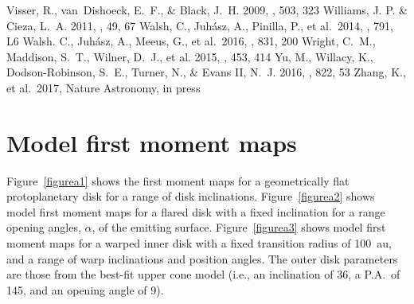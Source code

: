 \documentclass[onecolumn]{aastex6}
\newcommand{\kms}{km~s$^{-1}$}
\begin{document}
\begin{thebibliography}{}
 Visser, R., van~Dishoeck, E.~F., \& Black, J.~H. 2009, \aap, 503, 323
 Williams, J. P. \& Cieza, L.~A. 2011, \araa, 49, 67
 Walsh, C., Juh\'{a}sz, A., Pinilla, P., et al.~2014, \apjl, 791, L6
 Walsh. C., Juh\'{a}sz, A., Meeus, G., et al.~2016, \apj, 831, 200
 Wright, C.~M., Maddison, S.~T., Wilner, D.~J., et al. 2015, \mnras, 453, 414
 Yu, M., Willacy, K., Dodson-Robinson, S.~E., Turner, N., \& Evans II, N.~J. 2016, \apj, 822, 53
 Zhang, K., et al.~2017, Nature Astronomy, in press
\end{thebibliography}

\appendix

\section{Model first moment maps}

Figure~\ref{figurea1} shows the first moment maps for a geometrically
flat protoplanetary disk for a range of disk inclinations.
Figure~\ref{figurea2} shows model first moment maps for a flared
disk with a fixed inclination for a range opening angles, $\alpha$, of the emitting
surface.
Figure~\ref{figurea3} shows model first moment maps for a warped inner disk
with a fixed transition radius of 100~au, and a range
of warp inclinations and position angles.
The outer disk parameters are those from the best-fit upper cone model
(i.e., an inclination of 36\degree, a P.A.~of 145\degree, and an opening angle
of 9\degree).

\begin{figure*}[]
\caption{Model first moment maps for a geometrically flat disk with the a P.A.~of
145\degree~(representative of the HD~100546 disk) at an inclination of 30\degree~(left),
45\degree~(middle), and 60\degree~(right).
The contours are in units of a single spectral resolution element (0.21 \kms).}
\label{figurea1}
\end{figure*}
\end{document}
